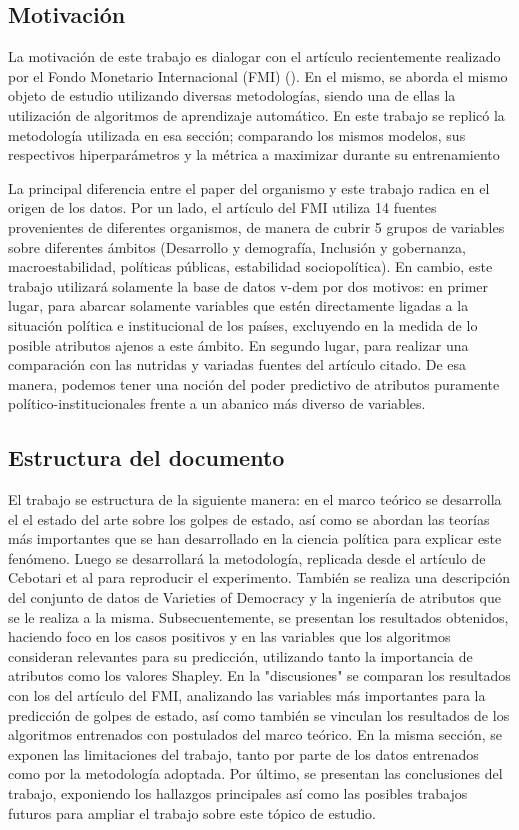 \documentclass{article}
\begin{document}
\subsection{Motivación}
La motivación de este trabajo es dialogar con el artículo recientemente realizado por el 
Fondo Monetario Internacional (FMI) (\cite{Ceb24}). En el mismo, se aborda el mismo objeto 
de estudio utilizando diversas metodologías, siendo una de ellas la utilización de 
algoritmos de aprendizaje automático. En este trabajo se replicó la metodología utilizada 
en esa sección; comparando los mismos modelos, sus respectivos hiperparámetros y la 
métrica a maximizar durante su entrenamiento

La principal diferencia entre el paper del organismo y este trabajo radica en el origen
de los datos. Por un lado, el artículo del FMI utiliza 14 fuentes provenientes de 
diferentes organismos, de manera de cubrir 5 grupos de variables sobre diferentes ámbitos 
(Desarrollo y demografía, Inclusión y gobernanza, macroestabilidad, políticas públicas, 
estabilidad sociopolítica). En cambio, este trabajo utilizará solamente la base de datos 
v-dem por dos motivos: en primer lugar, para abarcar solamente variables que estén 
directamente ligadas a la situación política e institucional de los países, excluyendo en 
la medida de lo posible atributos ajenos a este ámbito. En segundo lugar, para realizar 
una comparación con las nutridas y variadas fuentes del artículo citado. De esa manera, 
podemos tener una noción del poder predictivo de atributos puramente 
político-institucionales frente a un abanico más diverso de variables.

\subsection{Estructura del documento}
El trabajo se estructura de la siguiente manera: en el marco teórico se desarrolla el
el estado del arte sobre los golpes de estado, así como se abordan las teorías más
importantes que se han desarrollado en la ciencia política para explicar este fenómeno.
Luego se desarrollará la metodología, replicada desde el artículo de Cebotari
et al para reproducir el experimento. También se realiza una descripción del conjunto de datos
de Varieties of Democracy y la ingeniería de atributos que se le realiza a la misma. Subsecuentemente, 
se presentan los resultados obtenidos, haciendo foco en los casos positivos y en las variables que los
algoritmos consideran relevantes para su predicción, utilizando tanto la importancia de atributos como
los valores Shapley. En la "discusiones" se comparan los resultados con los del artículo del FMI,
analizando las variables más importantes para la predicción de golpes de estado, así como también se 
vinculan los resultados de los algoritmos entrenados con postulados del marco teórico. En la misma
sección, se exponen las limitaciones del trabajo, tanto por parte de los datos entrenados como
por la metodología adoptada. Por último, se presentan las conclusiones del trabajo, exponiendo los 
hallazgos principales así como las posibles trabajos futuros para ampliar el trabajo sobre este 
tópico de estudio.
\end{document}
